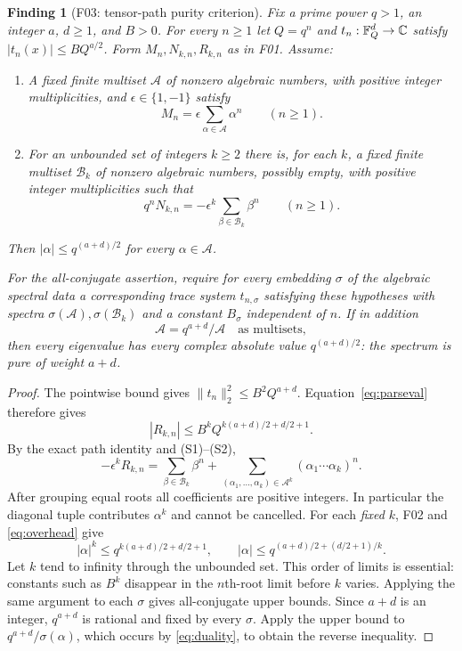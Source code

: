 \documentclass[11pt,a4paper]{article}
\newcommand{\fid}[1]{\textsf{#1}}\newcommand{\gate}[1]{\textsf{#1}}
\theoremstyle{named}\newtheorem{finding}{Finding}[section]
\theoremstyle{definition}\newtheorem{definition}[finding]{Definition}
\theoremstyle{remark}\newtheorem{remark}[finding]{Remark}
\begin{document}
\begin{finding}[\fid{F03}: tensor-path purity criterion]\label{f:criterion}
Fix a prime power $q>1$, an integer $a$, $d\ge1$, and $B>0$. For every $n\ge1$ let $Q=q^n$ and $t_n:\mathbb F_Q^d\to\mathbb C$ satisfy $|t_n(x)|\le BQ^{a/2}$. Form $M_n,N_{k,n},R_{k,n}$ as in \fid{F01}. Assume:
\begin{enumerate}[label=(S\arabic*)]
\item A fixed finite multiset $\mathcal A$ of nonzero algebraic numbers, with positive integer multiplicities, and $\epsilon\in\{1,-1\}$ satisfy
\[
 M_n=\epsilon\sum_{\alpha\in\mathcal A}\alpha^n\qquad(n\ge1).
\]
\item For an unbounded set of integers $k\ge2$ there is, for each $k$, a fixed finite multiset $\mathcal B_k$ of nonzero algebraic numbers, possibly empty, with positive integer multiplicities such that
\[
 q^nN_{k,n}=-\epsilon^k\sum_{\beta\in\mathcal B_k}\beta^n\qquad(n\ge1).
\]
\end{enumerate}
Then $|\alpha|\le q^{(a+d)/2}$ for every $\alpha\in\mathcal A$.

For the all-conjugate assertion, require for every embedding $\sigma$ of the algebraic spectral data a corresponding trace system $t_{n,\sigma}$ satisfying these hypotheses with spectra $\sigma(\mathcal A),\sigma(\mathcal B_k)$ and a constant $B_\sigma$ independent of $n$. If in addition
\begin{equation}\label{eq:duality}
 \mathcal A=q^{a+d}/\mathcal A
 \quad\text{as multisets},
\end{equation}
then every eigenvalue has every complex absolute value $q^{(a+d)/2}$: the spectrum is pure of weight $a+d$.
\end{finding}
\begin{proof}
The pointwise bound gives $\|t_n\|_2^2\le B^2Q^{a+d}$. Equation~\eqref{eq:parseval} therefore gives
\begin{equation}\label{eq:overhead}
 |R_{k,n}|\le B^kQ^{k(a+d)/2+d/2+1}.
\end{equation}
By the exact path identity and (S1)--(S2),
\begin{equation}\label{eq:positivespectrum}
 -\epsilon^kR_{k,n}=
 \sum_{\beta\in\mathcal B_k}\beta^n+
 \sum_{(\alpha_1,\ldots,\alpha_k)\in\mathcal A^k}
 (\alpha_1\cdots\alpha_k)^n.
\end{equation}
After grouping equal roots all coefficients are positive integers. In particular the diagonal tuple contributes $\alpha^k$ and cannot be cancelled. For each \emph{fixed} $k$, \fid{F02} and \eqref{eq:overhead} give
\[
 |\alpha|^k\le q^{k(a+d)/2+d/2+1},\qquad
 |\alpha|\le q^{(a+d)/2+(d/2+1)/k}.
\]
Let $k$ tend to infinity through the unbounded set. This order of limits is essential: constants such as $B^k$ disappear in the $n$th-root limit before $k$ varies. Applying the same argument to each $\sigma$ gives all-conjugate upper bounds. Since $a+d$ is an integer, $q^{a+d}$ is rational and fixed by every $\sigma$. Apply the upper bound to $q^{a+d}/\sigma(\alpha)$, which occurs by \eqref{eq:duality}, to obtain the reverse inequality.
\end{proof}
\end{document}

